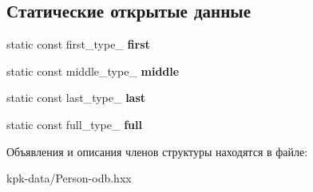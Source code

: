 \subsection*{Статические открытые данные}
\begin{DoxyCompactItemize}
\item 
static const first\+\_\+type\+\_\+ {\bfseries first}\hypertarget{structodb_1_1query__columns_3_01_1_1kpk_1_1data_1_1_person_00_01id__pgsql_00_01_a_01_4_1_1name__class___a82b8e6c77ce2567051102db707f79f3e}{}\label{structodb_1_1query__columns_3_01_1_1kpk_1_1data_1_1_person_00_01id__pgsql_00_01_a_01_4_1_1name__class___a82b8e6c77ce2567051102db707f79f3e}

\item 
static const middle\+\_\+type\+\_\+ {\bfseries middle}\hypertarget{structodb_1_1query__columns_3_01_1_1kpk_1_1data_1_1_person_00_01id__pgsql_00_01_a_01_4_1_1name__class___ae768d2b716059dc9a117e6700b9e70ea}{}\label{structodb_1_1query__columns_3_01_1_1kpk_1_1data_1_1_person_00_01id__pgsql_00_01_a_01_4_1_1name__class___ae768d2b716059dc9a117e6700b9e70ea}

\item 
static const last\+\_\+type\+\_\+ {\bfseries last}\hypertarget{structodb_1_1query__columns_3_01_1_1kpk_1_1data_1_1_person_00_01id__pgsql_00_01_a_01_4_1_1name__class___a806563e0473d582b4ed3e7795d147d08}{}\label{structodb_1_1query__columns_3_01_1_1kpk_1_1data_1_1_person_00_01id__pgsql_00_01_a_01_4_1_1name__class___a806563e0473d582b4ed3e7795d147d08}

\item 
static const full\+\_\+type\+\_\+ {\bfseries full}\hypertarget{structodb_1_1query__columns_3_01_1_1kpk_1_1data_1_1_person_00_01id__pgsql_00_01_a_01_4_1_1name__class___a5b7043664396cc0b64f5c059bd5b752b}{}\label{structodb_1_1query__columns_3_01_1_1kpk_1_1data_1_1_person_00_01id__pgsql_00_01_a_01_4_1_1name__class___a5b7043664396cc0b64f5c059bd5b752b}

\end{DoxyCompactItemize}


Объявления и описания членов структуры находятся в файле\+:\begin{DoxyCompactItemize}
\item 
kpk-\/data/Person-\/odb.\+hxx\end{DoxyCompactItemize}
